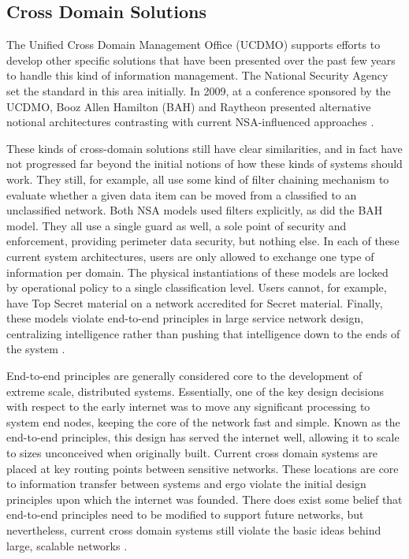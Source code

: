 \subsection{Cross Domain Solutions}
The Unified Cross Domain Management Office (UCDMO) supports efforts to develop other specific solutions that have been presented over the past few years to handle this kind of information management.  The National Security Agency set the standard in this area initially.  In 2009, at a conference sponsored by the UCDMO, Booz Allen Hamilton (BAH) and Raytheon presented alternative notional architectures contrasting with current NSA-influenced approaches \cite{proposal:nsa-arch,proposal:gig-arch,proposal:bah-arch,proposal:raytheon-arch}.

These kinds of cross-domain solutions still have clear similarities, and in fact have not progressed far beyond the initial notions of how these kinds of systems should work.  They still, for example, all use some kind of filter chaining mechanism to evaluate whether a given data item can be moved from a classified to an unclassified network.  Both NSA models used filters explicitly, as did the BAH model.  They all use a single guard as well, a sole point of security and enforcement, providing perimeter data security, but nothing else.  In each of these current system architectures, users are only allowed to exchange one type of information per domain.  The physical instantiations of these models are locked by operational policy to a single classification level.  Users cannot, for example, have Top Secret material on a network accredited for Secret material.  Finally, these models violate end-to-end principles in large service network design, centralizing intelligence rather than pushing that intelligence down to the ends of the system \cite{Clark:1995:DPD:205447.205458}.

End-to-end principles are generally considered core to the development of extreme scale, distributed systems.  Essentially, one of the key design decisions with respect to the early internet was to move any significant processing to system end nodes, keeping the core of the network fast and simple.  Known as the end-to-end principles, this design has served the internet well, allowing it to scale to sizes unconceived when originally built.  Current cross domain systems are placed at key routing points between sensitive networks.  These locations are core to information transfer between systems and ergo violate the initial design principles upon which the internet was founded.  There does exist some belief that end-to-end principles need to be modified to support future networks, but nevertheless, current cross domain systems still violate the basic ideas behind large, scalable networks \cite{Blumenthal:2001:RDI:383034.383037}.

